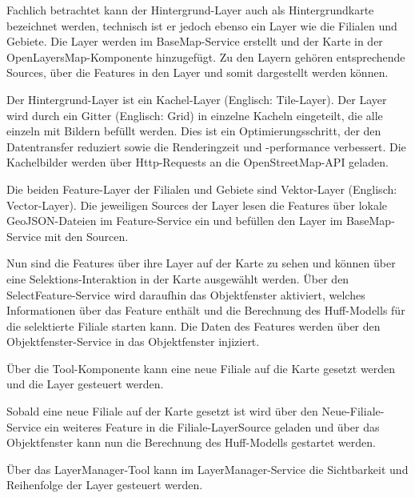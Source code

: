 Fachlich betrachtet kann der Hintergrund-Layer auch als Hintergrundkarte bezeichnet werden, technisch ist er jedoch ebenso ein Layer wie die Filialen und Gebiete. 
Die Layer werden im BaseMap-Service erstellt und der Karte in der OpenLayersMap-Komponente hinzugefügt.
Zu den Layern gehören entsprechende Sources, über die Features in den Layer und somit dargestellt werden können.

Der Hintergrund-Layer ist ein Kachel-Layer (Englisch: Tile-Layer).
Der Layer wird durch ein Gitter (Englisch: Grid) in einzelne Kacheln eingeteilt, die alle einzeln mit Bildern befüllt werden.
Dies ist ein Optimierungsschritt, der den Datentransfer reduziert sowie die Renderingzeit und -performance verbessert.
Die Kachelbilder werden über Http-Requests an die OpenStreetMap-API geladen.

Die beiden Feature-Layer der Filialen und Gebiete sind Vektor-Layer (Englisch: Vector-Layer).
Die jeweiligen Sources der Layer lesen die Features über lokale GeoJSON-Dateien im Feature-Service ein und befüllen den Layer im BaseMap-Service mit den Sourcen.

Nun sind die Features über ihre Layer auf der Karte zu sehen und können über eine Selektions-Interaktion in der Karte ausgewählt werden.
Über den SelectFeature-Service wird daraufhin das Objektfenster aktiviert, welches Informationen über das Feature enthält und die Berechnung des Huff-Modells für die selektierte Filiale starten kann.
Die Daten des Features werden über den Objektfenster-Service in das Objektfenster injiziert.

Über die Tool-Komponente kann eine neue Filiale auf die Karte gesetzt werden und die Layer gesteuert werden.

Sobald eine neue Filiale auf der Karte gesetzt ist wird über den Neue-Filiale-Service ein weiteres Feature in die Filiale-LayerSource geladen und über das Objektfenster kann nun die Berechnung des Huff-Modells gestartet werden.

Über das LayerManager-Tool kann im LayerManager-Service die Sichtbarkeit und Reihenfolge der Layer gesteuert werden.

